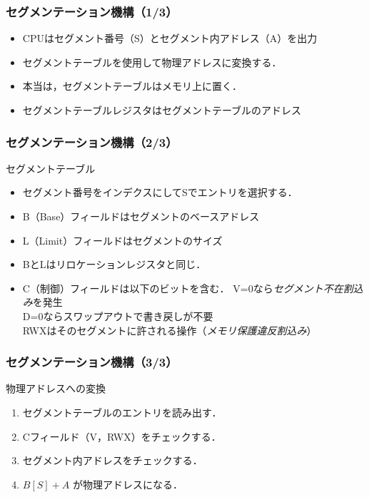\documentclass[unicode,handout]{beamer}                   %
\begin{document}
\begin{frame}
  \frametitle{セグメンテーション機構（1/3）}

  \begin{itemize}
  \item CPUはセグメント番号（S）とセグメント内アドレス（A）を出力
  \item セグメントテーブルを使用して物理アドレスに変換する．
  \item 本当は，セグメントテーブルはメモリ上に置く．
  \item セグメントテーブルレジスタはセグメントテーブルのアドレス
  \end{itemize}
\end{frame}

\begin{frame}
  \frametitle{セグメンテーション機構（2/3）}
  セグメントテーブル
  \begin{itemize}
  \item セグメント番号をインデクスにしてSでエントリを選択する．
  \item B（Base）フィールドはセグメントのベースアドレス
  \item L（Limit）フィールドはセグメントのサイズ
  \item BとLはリロケーションレジスタと同じ．
  \item C（制御）フィールドは以下のビットを含む．
    \vspace{3mm}
    V=0なら\emph{セグメント不在割込み}を発生 \\
    D=0ならスワップアウトで書き戻しが不要 \\
    RWXはそのセグメントに許される操作（\emph{メモリ保護違反割込み}）
  \end{itemize}
\end{frame}

\begin{frame}
  \frametitle{セグメンテーション機構（3/3）}

  物理アドレスへの変換
  \begin{enumerate}
  \item[1] セグメントテーブルのエントリを読み出す．
  \item[2] Cフィールド（V，RWX）をチェックする．
  \item[3] セグメント内アドレスをチェックする．
  \item[4] $B[S] + A$ が物理アドレスになる．
  \end{enumerate}
\end{frame}
\end{document}
